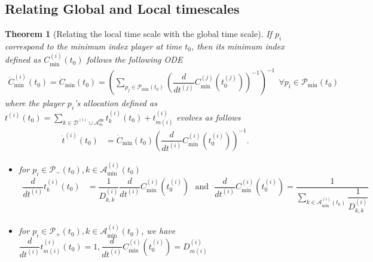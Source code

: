 \documentclass{article}
\newcommand{\UMA}{\mathcal{A}^{\texttt{UM}}}
\newtheorem{theorem}{Theorem}
\begin{document}











\subsection{Relating Global and Local timescales}

\begin{theorem}[Relating the local time scale with the global time scale]
\label{thm:onesidedlocalglobal}
    If $p_i$ correspond to the minimum index player at time $t_0$, then its minimum index defined as $C^{(i)}_{\min}(t_0)$ follows the following ODE 
    \begin{align}
 \dot{C}^{(i)}_{\min}(t_0)  = \dot{C}_{\min}(t_0)= \left({\sum_{p_j\in\mathcal{P}_{\min}(t_0)}\left(\dfrac{d}{dt^{(j)}}C^{(j)}_{\min}(t_0^{(j)})\right)^{-1}}\right)^{-1}\ \ \forall p_i\in\mathcal{P}_{\min}(t_0) \label{eq:cminlocal}
\end{align}
where the player $p_i$'s allocation defined as $t^{(i)}(t_0)=\sum_{k\in\mathcal{D}^{(i)}\cup \UMA_m}t^{(i)}_k(t_0)+t^{(i)}_{m(i)}$ evolves as follows
\begin{align*}
    \dot{t}^{(i)}(t_0) &= 
    \dot{C}_{\min}(t_0)\left(\dfrac{d}{dt^{(i)}}C^{(i)}_{\min}(t_0^{(i)})\right)^{-1}.
\end{align*}
\begin{itemize}
    \item for $p_i\in \mathcal{P}_{-}(t_0), k\in\mathcal{A}^{(i)}_{\min}(t_0)$
    \begin{align*}
        \dfrac{d}{dt^{(i)}}t^{(i)}_k(t_0)  &= \dfrac{1}{D^{(i)}_{k,k}} \dfrac{d}{dt^{(i)}}C^{(i)}_{\min}(t_0^{(i)})\ \ \  \text{and}\ \ \ 
        \dfrac{d}{dt^{(i)}}C^{(i)}_{\min}(t_0^{(i)})= \dfrac{1}{\sum_{k\in\mathcal{A}^{(i)}_{\min}(t_0)}\dfrac{1}{D^{(i)}_{k,k}}}
    \end{align*}
    \item for $p_i\in \mathcal{P}_{+}(t_0), k\in\mathcal{A}^{(i)}_{\min}(t_0)$, we have $\dfrac{d}{dt^{(i)}}t^{(i)}_{m(i)}(t_0) =1, \dfrac{d}{dt^{(i)}}C^{(i)}_{\min}(t_0^{(i)})=D^{(i)}_{m(i)}$

\end{itemize}
\end{theorem}
\end{document}
